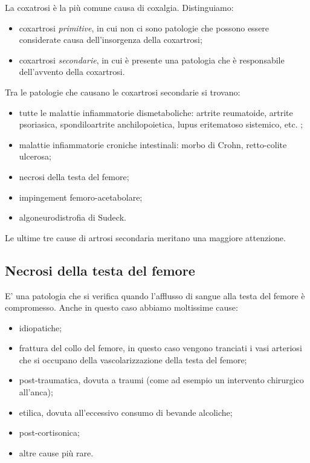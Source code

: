 La coxatrosi è la più comune causa di coxalgia. Distinguiamo:

\begin{itemize}
\item
  coxartrosi \emph{primitive}, in cui non ci sono patologie che possono essere considerate causa dell'insorgenza della coxartrosi;
\item
  coxartrosi \emph{secondarie}, in cui è presente una patologia che è responsabile dell'avvento della coxartrosi.
\end{itemize}

Tra le patologie che causano le coxartrosi secondarie si trovano:

\begin{itemize}
\item
  tutte le malattie infiammatorie dismetaboliche: artrite reumatoide, artrite psoriasica, spondiloartrite anchilopoietica, lupus eritematoso sistemico, etc. ;
\item
  malattie infiammatorie croniche intestinali: morbo di Crohn, retto-colite ulcerosa;
\item
  necrosi della testa del femore;
\item
  impingement femoro-acetabolare;
\item
  algoneurodistrofia di Sudeck.
\end{itemize}

Le ultime tre cause di artrosi secondaria meritano una maggiore attenzione.

\subsection{Necrosi della testa del femore}

E' una patologia che si verifica quando l'afflusso di sangue alla testa del femore è compromesso. Anche in questo caso abbiamo moltissime cause:

\begin{itemize}
\item
  idiopatiche;
\item
  frattura del collo del femore, in questo caso vengono tranciati i vasi arteriosi che si occupano della vascolarizzazione della testa del femore;
\item
  post-traumatica, dovuta a traumi (come ad esempio un intervento chirurgico all'anca);
\item
  etilica, dovuta all'eccessivo consumo di bevande alcoliche;
\item
  post-cortisonica;
\item
  altre cause più rare.
\end{itemize}

